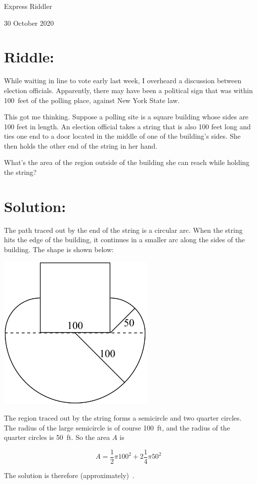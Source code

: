 \documentclass{article}
\begin{document}
\pagestyle{empty} %

\begin{center}
{\LARGE Express Riddler}

\vspace{0.15in}

{\Large 30 October 2020}
\end{center}


\section*{Riddle:}

While waiting in line to vote early last week, I overheard a discussion between election officials.
Apparently, there may have been a political sign that was within 100~feet of the polling place, against New York State law.

This got me thinking.
Suppose a polling site is a square building whose sides are 100 feet in length.
An election official takes a string that is also 100 feet long and ties one end to a door located in the middle of one of the building’s sides.
She then holds the other end of the string in her hand.

What's the area of the region outside of the building she can reach while holding the string?

\section*{Solution:}

The path traced out by the end of the string is a circular arc.
When the string hits the edge of the building, it continues in a smaller arc along the sides of the building.
The shape is shown below:

\vspace{0.1in}
\begin{center}
\includegraphics[width=3in]{polling_radius.png}
\end{center}
\vspace{0.1in}

The region traced out by the string forms a semicircle and two quarter circles.
The radius of the large semicircle is of course 100~ft, and the radius of the quarter circles is 50~ft.
So the area $A$ is

\[
A=\frac{1}{2}\pi 100^2+2\frac{1}{4}\pi 50^2
\]

The solution is therefore (approximately)
\,.
\end{document}
